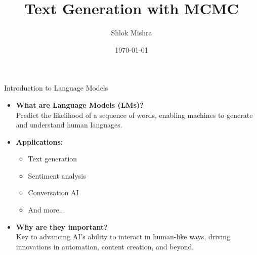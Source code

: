 \documentclass{beamer}
\title{Text Generation with MCMC}
\author{Shlok Mishra}
\date{\today} %
\begin{document}
\begin{frame}
    \titlepage
\end{frame}

\begin{frame}{Introduction to Language Models}
    \begin{itemize}
        \item \textbf{What are Language Models (LMs)?} \\
              Predict the likelihood of a sequence of words, enabling machines to generate and understand human languages.
        \item \textbf{Applications:}
              \begin{itemize}
                  \item Text generation
                  \item Sentiment analysis
                  \item Conversation AI
                  \item And more...
              \end{itemize}
        \item \textbf{Why are they important?} \\
              Key to advancing AI's ability to interact in human-like ways, driving innovations in automation, content creation, and beyond.
    \end{itemize}
\end{frame}
\end{document}

